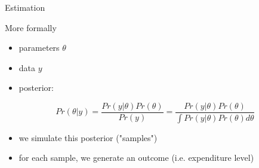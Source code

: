 \documentclass[presentation]{beamer}
\begin{document}
\begin{frame}[label={sec:org025e19e},fragile]{Estimation}
\begin{block}{More formally}
\begin{itemize}
\item parameters \(\theta\)
\item data \(y\)
\item posterior:
\end{itemize}
\begin{equation}
Pr(\theta|y) = \frac{Pr(y|\theta)Pr(\theta)}{Pr(y)} = \frac{Pr(y|\theta)Pr(\theta)}{\int Pr(y|\theta)Pr(\theta)d\theta }
\end{equation}
\begin{itemize}
\item we simulate this posterior ("samples")
\item for each sample, we generate an outcome (i.e. expenditure level)
\end{itemize}
\end{block}
\end{frame}
\end{document}
